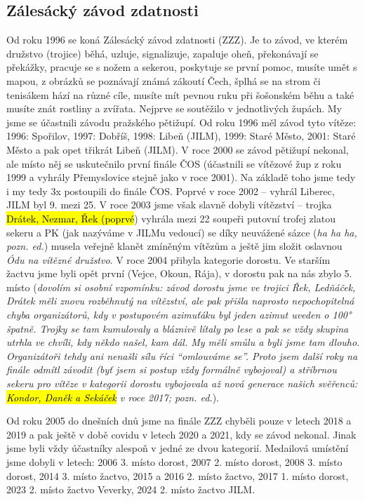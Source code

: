 \subsection{Zálesácký závod
zdatnosti}\label{zuxe1lesuxe1ckuxfd-zuxe1vod-zdatnosti}

Od roku 1996 se koná Zálesácký závod zdatnosti (ZZZ). Je to závod, ve
kterém družstvo (trojice) běhá, uzluje, signalizuje, zapaluje oheň,
překonávají se překážky, pracuje se s nožem a sekerou, poskytuje se
první pomoc, musíte umět s mapou, z obrázků se poznávají známá zákoutí
Čech, šplhá se na strom či tenisákem hází na různé cíle, musíte mít
pevnou ruku při šošonském běhu a také musíte znát rostliny a zvířata.
Nejprve se soutěžilo v jednotlivých župách. My jsme se účastnili závodu
pražského pětižupí. Od roku 1996 měl závod tyto vítěze: 1996: Spořilov,
1997: Dobříš, 1998: Libeň (JILM), 1999: Staré Město, 2001: Staré Město a
pak opet třikrát Libeň (JILM). V roce 2000 se závod pětižupí nekonal,
ale místo něj se uskutečnilo první finále ČOS (účastnili se vítězové žup
z roku 1999 a vyhrály Přemyslovice stejně jako v roce 2001). Na základě
toho jsme tedy i my tedy 3x postoupili do finále ČOS. Poprvé v roce 2002
-- vyhrál Liberec, JILM byl 9. mezi 25. V roce 2003 jsme však slavně
dobyli vítězství -- trojka \hl{Drátek, Nezmar, Řek (poprvé}) vyhrála
mezi 22 soupeři putovní trofej zlatou sekeru a PK (jak nazýváme v JILMu
vedoucí) se díky neuvážené sázce (\emph{ha ha ha, pozn. ed.}) musela
veřejně klanět zmíněným vítězům a ještě jim složit oslavnou \emph{Ódu na
vítězné družstvo}. V roce 2004 přibyla kategorie dorostu. Ve starším
žactvu jsme byli opět první (Vejce, Okoun, Rája), v dorostu pak na nás
zbylo 5. místo (\emph{dovolím si osobní vzpomínku: závod dorostu jsme ve
trojici Řek, Ledňáček, Drátek měli znovu rozběhnutý na vítězství, ale
pak přišla naprosto nepochopitelná chyba organizátorů, kdy v postupovém
azimuťáku byl jeden azimut uveden o 100° špatně. Trojky se tam
kumulovaly a bláznivě lítaly po lese a pak se vždy skupina utrhla ve
chvíli, kdy někdo našel, kam dál. My měli smůlu a byli jsme tam dlouho.
Organizátoři tehdy ani nenašli sílu říci ``omlouváme se''. Proto jsem
další roky na finále odmítl závodit (byť jsem si postup vždy formálně
vybojoval) a stříbrnou sekeru pro vítěze v kategorii dorostu vybojovala
až nová generace našich svěřenců: \hl{Kondor, Daněk a Sekáček} v roce
2017; pozn. ed.}).

Od roku 2005 do dnešních dnů jsme na finále ZZZ chyběli pouze v letech
2018 a 2019 a pak ještě v době covidu v letech 2020 a 2021, kdy se závod
nekonal. Jinak jsme byli vždy účastníky alespoň v jedné ze dvou
kategorií. Medailová umístění jsme dobyli v letech: 2006 3. místo
dorost, 2007 2. místo dorost, 2008 3. místo dorost, 2014 3. místo
žactvo, 2015 a 2016 2. místo žactvo, 2017 1. místo dorost, 2023 2. místo
žactvo Veverky, 2024 2. místo žactvo JILM.

